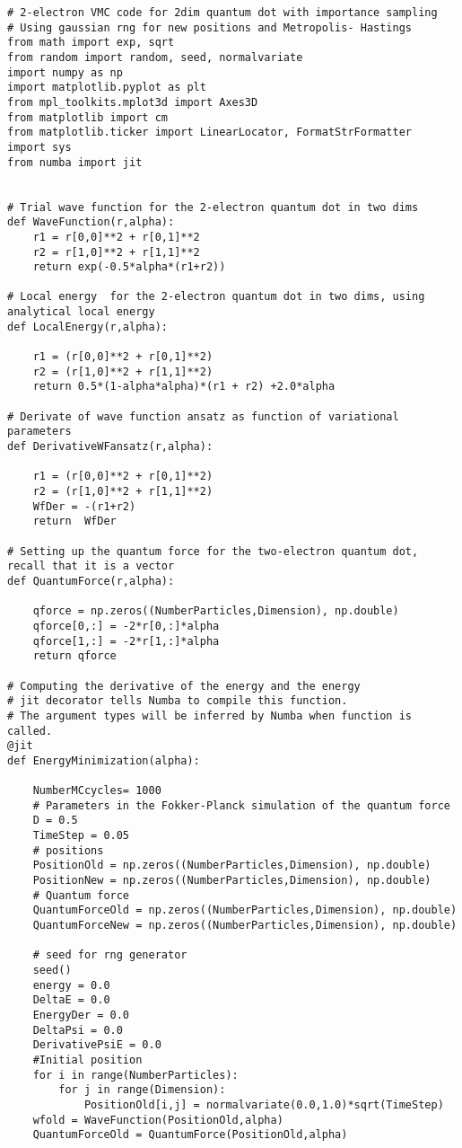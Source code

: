 \documentclass[%
oneside,                 %
final,                   %
10pt]{article}
\begin{document}
\begin{verbatim}
# 2-electron VMC code for 2dim quantum dot with importance sampling
# Using gaussian rng for new positions and Metropolis- Hastings 
from math import exp, sqrt
from random import random, seed, normalvariate
import numpy as np
import matplotlib.pyplot as plt
from mpl_toolkits.mplot3d import Axes3D
from matplotlib import cm
from matplotlib.ticker import LinearLocator, FormatStrFormatter
import sys
from numba import jit


# Trial wave function for the 2-electron quantum dot in two dims
def WaveFunction(r,alpha):
    r1 = r[0,0]**2 + r[0,1]**2
    r2 = r[1,0]**2 + r[1,1]**2
    return exp(-0.5*alpha*(r1+r2))

# Local energy  for the 2-electron quantum dot in two dims, using analytical local energy
def LocalEnergy(r,alpha):
    
    r1 = (r[0,0]**2 + r[0,1]**2)
    r2 = (r[1,0]**2 + r[1,1]**2)
    return 0.5*(1-alpha*alpha)*(r1 + r2) +2.0*alpha

# Derivate of wave function ansatz as function of variational parameters
def DerivativeWFansatz(r,alpha):
    
    r1 = (r[0,0]**2 + r[0,1]**2)
    r2 = (r[1,0]**2 + r[1,1]**2)
    WfDer = -(r1+r2)
    return  WfDer

# Setting up the quantum force for the two-electron quantum dot, recall that it is a vector
def QuantumForce(r,alpha):

    qforce = np.zeros((NumberParticles,Dimension), np.double)
    qforce[0,:] = -2*r[0,:]*alpha
    qforce[1,:] = -2*r[1,:]*alpha
    return qforce
    
# Computing the derivative of the energy and the energy 
# jit decorator tells Numba to compile this function.
# The argument types will be inferred by Numba when function is called.
@jit
def EnergyMinimization(alpha):

    NumberMCcycles= 1000
    # Parameters in the Fokker-Planck simulation of the quantum force
    D = 0.5
    TimeStep = 0.05
    # positions
    PositionOld = np.zeros((NumberParticles,Dimension), np.double)
    PositionNew = np.zeros((NumberParticles,Dimension), np.double)
    # Quantum force
    QuantumForceOld = np.zeros((NumberParticles,Dimension), np.double)
    QuantumForceNew = np.zeros((NumberParticles,Dimension), np.double)

    # seed for rng generator 
    seed()
    energy = 0.0
    DeltaE = 0.0
    EnergyDer = 0.0
    DeltaPsi = 0.0
    DerivativePsiE = 0.0
    #Initial position
    for i in range(NumberParticles):
        for j in range(Dimension):
            PositionOld[i,j] = normalvariate(0.0,1.0)*sqrt(TimeStep)
    wfold = WaveFunction(PositionOld,alpha)
    QuantumForceOld = QuantumForce(PositionOld,alpha)


\end{verbatim}
\end{document}
